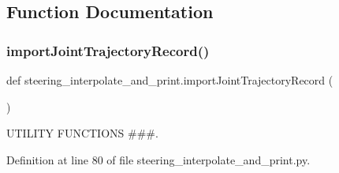 \subsection{Function Documentation}
\mbox{\label{namespacesteering__interpolate__and__print_a6222ad19f86d4f86d29313c773212a98}} 
\subsubsection{\texorpdfstring{importJointTrajectoryRecord()}{importJointTrajectoryRecord()}}
{\footnotesize\ttfamily def steering\+\_\+interpolate\+\_\+and\+\_\+print.\+import\+Joint\+Trajectory\+Record (\begin{DoxyParamCaption}{ }\end{DoxyParamCaption})}



U\+T\+I\+L\+I\+TY F\+U\+N\+C\+T\+I\+O\+NS \#\#\#. 



Definition at line 80 of file steering\+\_\+interpolate\+\_\+and\+\_\+print.\+py.


